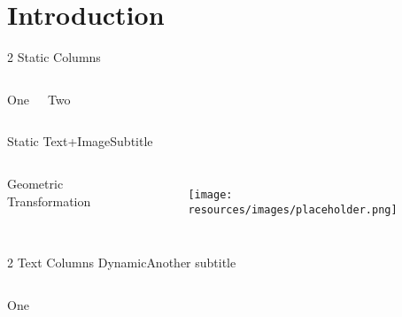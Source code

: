  \section{Introduction}

\begin{frame}{2 Static Columns}
    \vfill
    \begin{columns}

        \begin{center}
        {\Huge{} One\par}
        \end{center}

        \begin{center}
        {\Huge{} Two\par}
        \end{center}
    \end{columns}

    \vfill
  \end{frame}

  \begin{frame}{Static Text+Image}{Subtitle}

        \begin{columns}

            { \flushleft \Huge  Geometric Transformation\par}

            \begin{figure}[h]
                \centering
                \texttt{[image: resources/images/placeholder.png]}
            \end{figure}

        \end{columns}
    
  \end{frame}

  \begin{frame}{2 Text Columns Dynamic}{Another subtitle}

        \begin{columns}

           { \flushleft \Huge  One\par}




        \end{columns}
    
  \end{frame}


